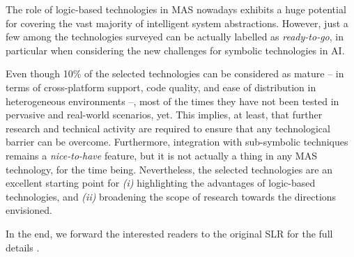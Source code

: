 \documentclass[12pt,a4paper,openright,twoside]{book}
\begin{document}
The role of logic-based technologies in MAS nowadays exhibits a huge potential for covering the vast majority of intelligent system abstractions.
%
However, just a few among the technologies surveyed can be actually labelled as \emph{ready-to-go}, in particular when considering the new challenges for symbolic technologies in AI.

Even though 10\% of the selected technologies can be considered as mature -- in terms of cross-platform support, code quality, and ease of distribution in heterogeneous environments --, most of the times they have not been tested in pervasive and real-world scenarios, yet.
%
This implies, at least, that further research and technical activity are required to ensure that any technological barrier can be overcome.
%
Furthermore, integration with sub-symbolic techniques remains a \emph{nice-to-have} feature, but it is not actually a thing in any MAS technology, for the time being.
%
Nevertheless, the selected technologies are an excellent starting point for \emph{(i)} highlighting the advantages of logic-based technologies, and  \emph{(ii)} broadening the scope of research towards the directions envisioned.

In the end, we forward the interested readers to the original SLR for the full details \cite{lptech4mas-jaamas35}.






%
\end{document}
